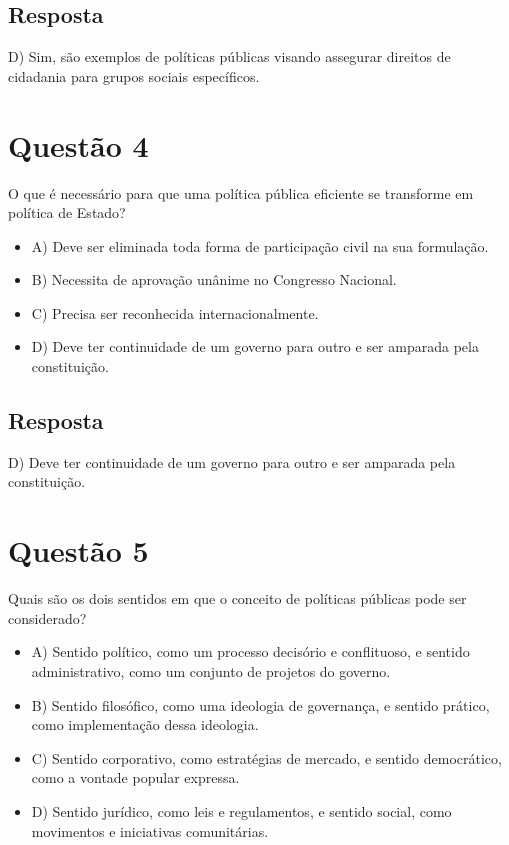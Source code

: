 \documentclass[
   article,       
   12pt,          
   oneside,       
   a4paper,       
   english,       
   brazil,        
   sumario=tradicional
   ]{abntex2}
\begin{document}
\subsection{Resposta}
D) Sim, são exemplos de políticas públicas visando assegurar direitos de cidadania para grupos sociais específicos.

\section{Questão 4}
O que é necessário para que uma política pública eficiente se transforme em política de Estado?
\begin{itemize}
    \item {A) Deve ser eliminada toda forma de participação civil na sua formulação.}
    \item {B) Necessita de aprovação unânime no Congresso Nacional.}
    \item {C) Precisa ser reconhecida internacionalmente.}
    \item {D) Deve ter continuidade de um governo para outro e ser amparada pela constituição.}
\end{itemize}

\subsection{Resposta}
D) Deve ter continuidade de um governo para outro e ser amparada pela constituição.

\section{Questão 5}
Quais são os dois sentidos em que o conceito de políticas públicas pode ser considerado?
\begin{itemize}
    \item {A) Sentido político, como um processo decisório e conflituoso, e sentido administrativo, como um conjunto de projetos do governo.}
    \item {B) Sentido filosófico, como uma ideologia de governança, e sentido prático, como implementação dessa ideologia.}
    \item {C) Sentido corporativo, como estratégias de mercado, e sentido democrático, como a vontade popular expressa.}
    \item {D) Sentido jurídico, como leis e regulamentos, e sentido social, como movimentos e iniciativas comunitárias.}
\end{itemize}
\end{document}
